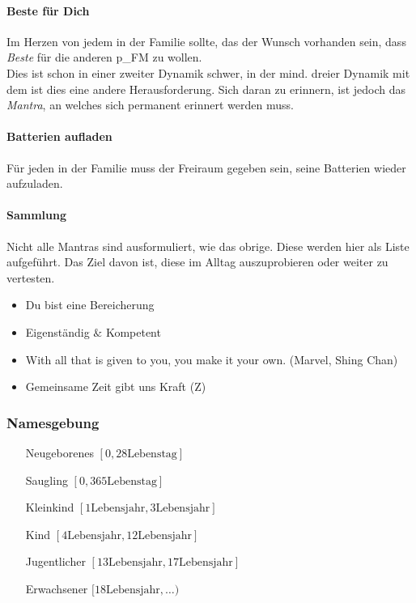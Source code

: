 \paragraph{Beste für Dich}
Im Herzen von jedem in der Familie sollte, das der Wunsch vorhanden sein, dass \textit{Beste} für die anderen \gls{p_FM} zu wollen.\\

Dies ist schon in einer zweiter Dynamik schwer, in der mind. dreier Dynamik mit dem  ist dies eine andere Herausforderung. Sich daran zu erinnern, ist jedoch das \textit{Mantra}, an welches sich permanent erinnert werden muss.

\paragraph{Batterien aufladen} Für jeden in der Familie muss der Freiraum gegeben sein, seine Batterien wieder aufzuladen.

\paragraph{Sammlung} 
Nicht alle Mantras sind ausformuliert, wie das obrige. Diese werden hier als Liste aufgeführt. Das Ziel davon ist, diese im Alltag auszuprobieren oder weiter zu vertesten. 

\begin{itemize}
	\item Du bist eine Bereicherung
	\item Eigenständig $\&$ Kompetent
	\item With all that is given to you, you make it your own. (Marvel, Shing Chan)
	\item Gemeinsame Zeit gibt uns Kraft (Z)
\end{itemize}

\subsubsection{Namesgebung}

\begin{itemize}
	\item[Neugeborenes] $[0, 28 \text{Lebenstag}]$
	\item[Saugling] $[0,365 \text{Lebenstag}]$
	\item[Kleinkind] $[1 \text{Lebensjahr}, 3 \text{Lebensjahr}]$
	\item[Kind] $[4 \text{Lebensjahr}, 12 \text{Lebensjahr}]$
	\item[Jugentlicher] $[13 \text{Lebensjahr}, 17 \text{Lebensjahr}]$
	\item[Erwachsener] $[18 \text{Lebensjahr}, \dots )$
\end{itemize}
